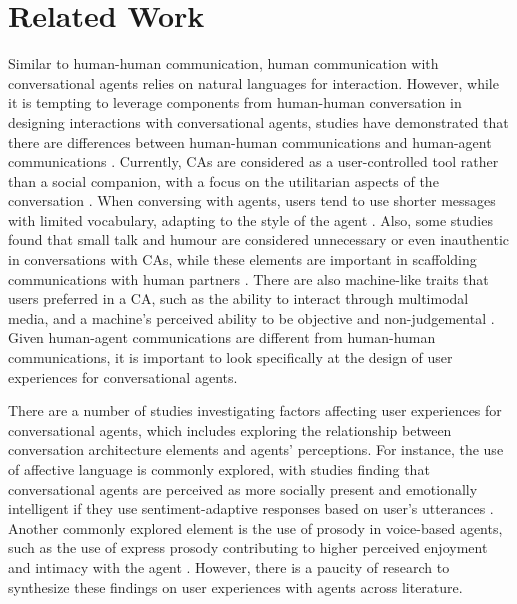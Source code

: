 
\section{Related Work}
Similar to human-human communication, human communication with conversational agents relies on natural languages for interaction. However, while it is tempting to leverage components from human-human conversation in designing interactions with conversational agents, studies have demonstrated that there are differences between human-human communications and human-agent communications \cite{clark2019makes, hill2015real}. Currently, CAs are considered as a user-controlled tool rather than a social companion, with a focus on the utilitarian aspects of the conversation \cite{clark2019makes}\cmt{[1]}. When conversing with agents, users tend to use shorter messages with limited vocabulary, adapting to the style of the agent \cite{hill2015real}. Also, some studies found that small talk and humour are considered unnecessary or even inauthentic in conversations with CAs, while these elements are important in scaffolding communications with human partners \cite{clark2019makes, doyle2019mapping}\cmt{[1],[2]}. There are also machine-like traits that users preferred in a CA, such as the ability to interact through multimodal media, and a machine's perceived ability to be objective and non-judgemental \cite{doyle2019mapping, kim2022understanding}\cmt{[2],[3]}. Given human-agent communications are different from human-human communications, it is important to look specifically at the design of user experiences for conversational agents.

There are a number of studies investigating factors affecting user experiences for conversational agents, which includes exploring the relationship between conversation architecture elements and agents' perceptions. For instance, the use of affective language is commonly explored, with studies finding that conversational agents are perceived as more socially present and emotionally intelligent if they use sentiment-adaptive responses based on user's utterances \cite{diederich2019emulating, yang2017perceived}. Another commonly explored element is the use of prosody in voice-based agents, such as the use of express prosody contributing to higher perceived enjoyment and intimacy with the agent \cite{kim2020can}. However, there is a paucity of research to synthesize these findings on user experiences with agents across literature. 

